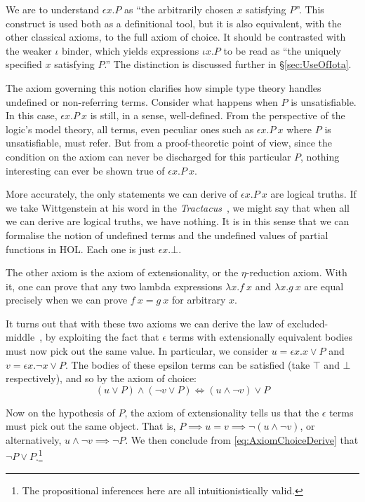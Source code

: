 We are to understand $\epsilon x. P$ as ``the arbitrarily chosen $x$ satisfying $P$''. This construct is used both as a definitional tool, but it is also equivalent, with the other classical axioms, to the full axiom of choice. It should be contrasted with the weaker $\iota$ binder, which yields expressions $\iota x. P$ to be read as ``the uniquely specified $x$ satisfying $P$.'' The distinction is discussed further in \S\ref{sec:UseOfIota}.

The axiom governing this notion clarifies how simple type theory handles undefined or non-referring terms. Consider what happens when $P$ is unsatisfiable. In this case, $\epsilon x. P\ x$ is still, in a sense, well-defined. From the perspective of the logic's model theory, all terms, even peculiar ones such as $\epsilon x. P\ x$ where $P$ is unsatisfiable, must refer. But from a proof-theoretic point of view, since the condition on the axiom can never be discharged for this particular $P$, nothing interesting can ever be shown true of $\epsilon x. P\ x$.

More accurately, the only statements we can derive of $\epsilon x. P\ x$ are logical truths. If we take Wittgenstein at his word in the \emph{Tractacus}~\cite{ToWitNothing}, we might say that when all we can derive are logical truths, we have nothing. It is in this sense that we can formalise the notion of undefined terms and the undefined values of partial functions in HOL. Each one is just $\epsilon x. \bot$.

The other axiom is the axiom of extensionality, or the $\eta$-reduction axiom. With it, one can prove that any two lambda expressions $\lambda x. f\ x$ and $\lambda x. g\ x$ are equal precisely when we can prove $f\ x = g\ x$ for arbitrary $x$.

It turns out that with these two axioms we can derive the law of excluded-middle~\cite{AxiomChoiceExcludedMiddle}, by exploiting the fact that $\epsilon$ terms with extensionally equivalent bodies must now pick out the same value. In particular, we consider $u = \epsilon x. x \vee P$ and $v = \epsilon x. \neg x \vee P$. The bodies of these epsilon terms can be satisfied (take $\top$ and $\bot$ respectively), and so by the axiom of choice:
\begin{equation}
  (u \vee P) \wedge (\neg v \vee P) \iff (u \wedge \neg v) \vee P \label{eq:AxiomChoiceDerive}
\end{equation}

Now on the hypothesis of $P$, the axiom of extensionality tells us that the $\epsilon$ terms must pick out the same object. That is, $P \implies u = v \implies \neg (u \wedge \neg v)$, or alternatively, $u \wedge \neg v \implies \neg P$. We then conclude from \eqref{eq:AxiomChoiceDerive} that $\neg P \vee P$.\footnote{The propositional inferences here are all intuitionistically valid.}

